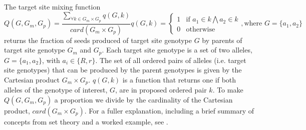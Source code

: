 \documentclass[10pt,letterpaper]{article}
\begin{document}

The target site mixing function
\begin{subequations}
\begin{equation}\label{eq:TSR_mixing_kern}
	Q(G, G_m, G_p) = \frac{\sum_{\forall k \in G_m \times G_p} q(G, k)}{card\left( G_m \times G_p \right)}
\end{equation}      
\begin{equation}\label{eq:allel_count}
	q(G, k) = \begin{cases}
		1 &\text{if } a_1 \in k \bigwedge a_2 \in k\\
		0 &\text{otherwise} 
	\end{cases}, \text{where } G = \{a_1, a_2\}
\end{equation} 
\end{subequations}
returns the fraction of seeds produced of target site genotype $G$ by parents of target site genotype $G_m$ and $G_p$. Each target site genotype is a set of two alleles, $G = \{a_1, a_2\}$, with $a_i \in \{R, r \}$. The set of all ordered pairs of alleles (i.e. target site genotypes) that can be produced by the parent genotypes is given by the Cartesian product $G_m \times G_p$. $q(G, k)$ is a function that returns one if both alleles of the genotype of interest, $G$, are in proposed ordered pair $k$. To make $Q(G, G_m, G_p)$ a proportion we divide by the cardinality of the Cartesian product, $card \left( G_m \times G_p \right)$. For a fuller explanation, including a brief summary of concepts from set theory and a worked example, see .
\end{document}
